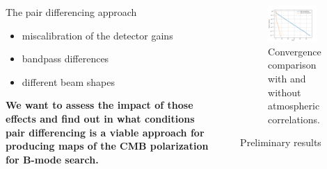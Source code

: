 \documentclass[final]{beamer}
\newlength{\sepwidth}
\newlength{\colwidth}
\newcommand{\separatorcolumn}{\begin{column}{\sepwidth}\end{column}}
\begin{document}
\begin{frame}[t]
\begin{columns}[t]
\begin{column}{\colwidth}
\begin{alertblock}{The pair differencing approach}
        \begin{itemize}
          \item miscalibration of the detector gains
          \item bandpass differences
          \item different beam shapes
        \end{itemize}

      \end{alertblock}

      \textbf{We want to assess the impact of those effects and find out in what conditions pair differencing is a viable approach for producing maps of the CMB polarization for B-mode search.}

    \end{column}

    \separatorcolumn

    \begin{column}{\colwidth}

      \begin{figure}
        \centering
        \includegraphics[width=0.8\textwidth]{figures/convergence.png}
        \caption{Convergence comparison with and without atmospheric correlations.}
        \label{fig:convergence}
      \end{figure}

      \begin{block}{Preliminary results}



\end{block}
\end{column}
\end{columns}
\end{frame}
\end{document}
